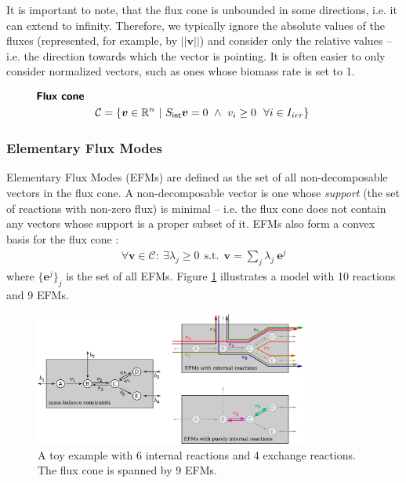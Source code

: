 \documentclass[10pt,a4paper]{article}
\newcommand{\mymatrix}[1]{#1}
\newcommand{\myvector}[1]{{\boldsymbol{#1}}}
\newcommand{\fluxcone}{\mathcal{C}}
\newcommand{\stoichmatint}{\mymatrix{S}_{\mathsf{int}}}
\begin{document}
It is important to note, that the flux cone is unbounded in some directions, i.e. it can extend to infinity. Therefore, we typically ignore the absolute values of the fluxes (represented, for example, by $||\myvector{v}||$) and consider only the relative values -- i.e. the direction towards which the vector is pointing. It is often easier to only consider normalized vectors, such as ones whose biomass rate is set to 1.
	
\begin{eqnarray}\label{eq:fluxcone}
	&\textsf{\textbf{Flux cone}} &\nonumber\\
	&&\fluxcone = \{\myvector{v} \in \mathbb{R}^n~|~\stoichmatint\myvector{v} = 0 ~\wedge ~ v_i \geq 0~~\forall i \in I_{irr}\}~~~~~~~~~~~~~~~~~
\end{eqnarray}

\subsubsection{Elementary Flux Modes}
Elementary Flux Modes (EFMs) are defined as the set of all non-decomposable vectors in the flux cone. A non-decomposable vector is one whose \textit{support} (the set of reactions with non-zero flux) is minimal -- i.e. the flux cone does not contain any vectors whose support is a proper subset of it. EFMs also form a convex basis for the flux cone \cite{schilling_theory_2000}:
\begin{eqnarray}
\forall \myvector{v} \in \fluxcone:~ \exists \lambda_j \geq 0 ~~\text{s.t.}~~ \myvector{v} = \sum_j \lambda_j~\myvector{e}^j
\end{eqnarray}
where $\{\myvector{e}^j\}_j$ is the set of all EFMs. Figure \ref{fig:toy1} illustrates a model with 10 reactions and 9 EFMs.
\begin{figure}[ht!]
	\begin{center}
	\includegraphics[width=0.8\textwidth]{toy1}
	\caption{A toy example with 6 internal reactions and 4 exchange reactions. The flux cone is spanned by 9 EFMs.}\label{fig:toy1}
	\end{center}
\end{figure}
\end{document}
